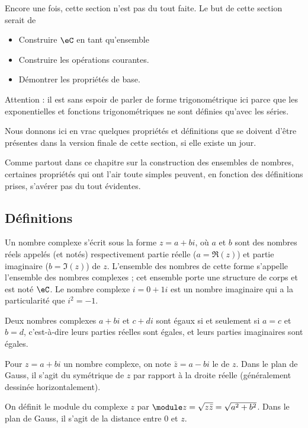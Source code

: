\begin{probleme}
    Encore une fois, cette section n'est pas du tout faite. Le but de cette section serait de
    \begin{itemize}
        \item Construire \( \eC\) en tant qu'ensemble
        \item Construire les opérations courantes.
        \item Démontrer les propriétés de base.
    \end{itemize}
    Attention : il est sans espoir de parler de forme trigonométrique ici parce que les exponentielles et fonctions trigonométriques ne sont définies qu'avec les séries.

    Nous donnons ici en vrac quelques propriétés et définitions que se doivent d'être présentes dans la version finale de cette section, si elle existe un jour.

    Comme partout dans ce chapitre sur la construction des ensembles de nombres, certaines propriétés qui ont l'air toute simples peuvent, en fonction des définitions prises, s'avérer pas du tout évidentes.
\end{probleme}


\subsection{Définitions}
Un nombre complexe s'écrit sous la forme $z = a + b i$, où $a$ et $b$
sont des nombres réels appelés (et notés) respectivement partie réelle
($a = \Re(z)$) et partie imaginaire ($b = \Im(z)$) de $z$. L'ensemble
des nombres de cette forme s'appelle l'ensemble des nombres complexes
; cet ensemble porte une structure de corps et est noté $\eC$. Le
nombre complexe $i = 0 + 1 i$ est un nombre imaginaire qui a la
particularité que $i^2 = -1$.

Deux nombres complexes $a + bi$ et $c + di$ sont égaux si et seulement
si $a = c$ et $b = d$, c'est-à-dire leurs parties réelles sont égales,
et leurs parties imaginaires sont égales.

Pour $z = a + bi$ un nombre complexe, on note $\bar z = a - bi$ le
 de $z$. Dans le plan de Gauss, il s'agit du
symétrique de $z$ par rapport à la droite réelle (généralement
dessinée horizontalement).

On définit le module du complexe $z$ par $\module z = \sqrt{z\bar z} =
\sqrt{a^2 + b^2}$. Dans le plan de Gauss, il s'agit de la distance
entre $0$ et $z$.

